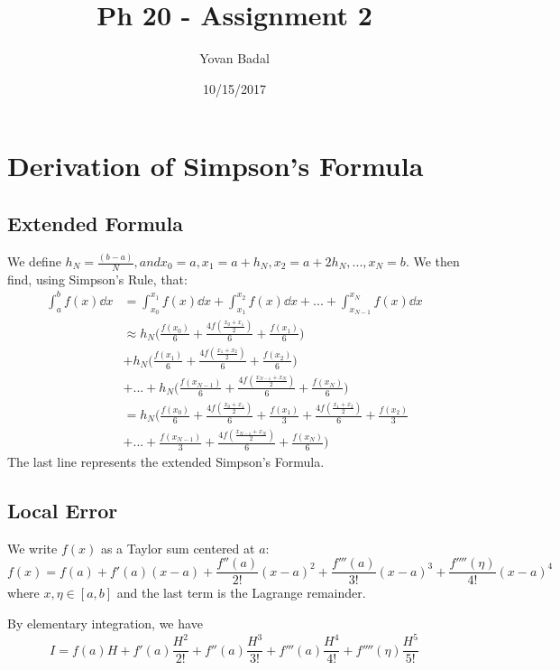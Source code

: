 \documentclass[11pt]{article}
\begin{document}
	\title{Ph 20 - Assignment 2}
	\author{Yovan Badal}
	\date{10/15/2017}
	\maketitle
	
\section{Derivation of Simpson's Formula}
\subsection{Extended Formula}
We define $h_N= \frac{(b-a)}{N},and x_0=a,x_1=a+h_N,x_2=a+ 2h_N,...,x_N=b$. We then find, using Simpson's Rule, that:
\begin{align*}
\int_a^b f(x) \dd{x} &= \int_{x_0}^{x_1} f(x) \dd{x} + \int_{x_1}^{x_2} f(x) \dd{x} + ... + \int_{x_{N-1}}^{x_N} f(x) \dd{x} \\
&\approx h_N\bigg(\frac{f(x_0)}{6} + \frac{4f(\frac{x_0 + x_1}{2})}{6} + \frac{f(x_1)}{6} \bigg) \\
&+ h_N\bigg(\frac{f(x_1)}{6} + \frac{4f(\frac{x_1 + x_2}{2})}{6} + \frac{f(x_2)}{6} \bigg) \\
&+ ... + h_N\bigg(\frac{f(x_{N-1})}{6} + \frac{4f(\frac{x_{N-1} + x_N}{2})}{6} + \frac{f(x_N)}{6} \bigg) \\
&= h_N \bigg(\frac{f(x_0)}{6} + \frac{4f(\frac{x_0 + x_1}{2})}{6} + \frac{f(x_1)}{3} + \frac{4f(\frac{x_1 + x_2}{2})}{6} + \frac{f(x_2)}{3} \\
&+ ... + \frac{f(x_{N-1})}{3} + \frac{4f(\frac{x_{N-1} + x_N}{2})}{6} + \frac{f(x_N)}{6} \bigg)
\end{align*}
The last line represents the extended Simpson's Formula.
\newpage

\subsection{Local Error}
We write $f(x)$ as a Taylor sum centered at $a$:
\[
f(x) = f(a) + f'(a)(x-a) + \frac{f''(a)}{2!} (x-a)^2 + \frac{f'''(a)}{3!} (x-a)^3 + \frac{f''''(\eta)}{4!} (x-a)^4
\]
where $x, \eta \in [a,b]$ and the last term is the Lagrange remainder.

By elementary integration, we have
\[
I = f(a)H + f'(a)\frac{H^2}{2!} + f''(a)\frac{H^3}{3!} + f'''(a)\frac{H^4}{4!} + f''''(\eta)\frac{H^5}{5!}
\]
\end{document}
